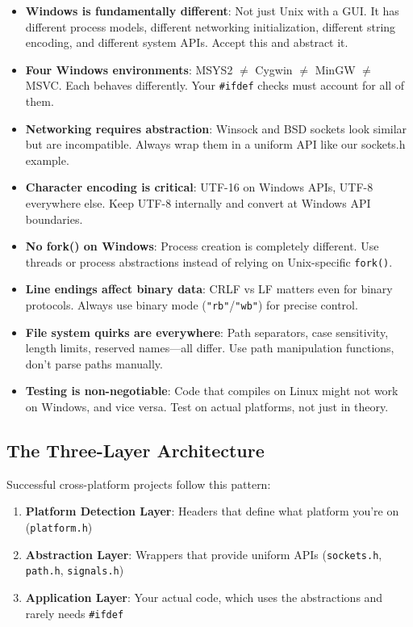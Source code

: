 \begin{itemize}
    \item \textbf{Windows is fundamentally different}: Not just Unix with a GUI. It has different process models, different networking initialization, different string encoding, and different system APIs. Accept this and abstract it.

    \item \textbf{Four Windows environments}: MSYS2 $\neq$ Cygwin $\neq$ MinGW $\neq$ MSVC. Each behaves differently. Your \texttt{\#ifdef} checks must account for all of them.

    \item \textbf{Networking requires abstraction}: Winsock and BSD sockets look similar but are incompatible. Always wrap them in a uniform API like our sockets.h example.

    \item \textbf{Character encoding is critical}: UTF-16 on Windows APIs, UTF-8 everywhere else. Keep UTF-8 internally and convert at Windows API boundaries.

    \item \textbf{No fork() on Windows}: Process creation is completely different. Use threads or process abstractions instead of relying on Unix-specific \texttt{fork()}.

    \item \textbf{Line endings affect binary data}: CRLF vs LF matters even for binary protocols. Always use binary mode (\texttt{"rb"}/\texttt{"wb"}) for precise control.

    \item \textbf{File system quirks are everywhere}: Path separators, case sensitivity, length limits, reserved names---all differ. Use path manipulation functions, don't parse paths manually.

    \item \textbf{Testing is non-negotiable}: Code that compiles on Linux might not work on Windows, and vice versa. Test on actual platforms, not just in theory.
\end{itemize}

\subsection{The Three-Layer Architecture}

Successful cross-platform projects follow this pattern:

\begin{enumerate}
    \item \textbf{Platform Detection Layer}: Headers that define what platform you're on (\texttt{platform.h})

    \item \textbf{Abstraction Layer}: Wrappers that provide uniform APIs (\texttt{sockets.h}, \texttt{path.h}, \texttt{signals.h})

    \item \textbf{Application Layer}: Your actual code, which uses the abstractions and rarely needs \texttt{\#ifdef}
\end{enumerate}

